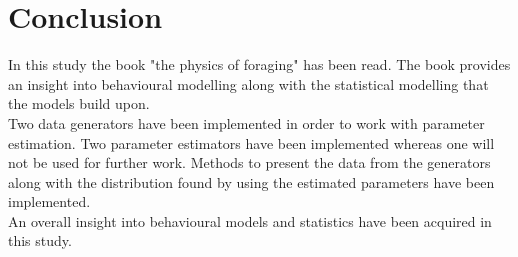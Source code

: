 \chapter{Conclusion}
In this study the book "the physics of foraging"\cite{viswanathan2011the} has been read. The book provides an insight into behavioural modelling along with the statistical modelling that the models build upon.\\
Two data generators have been implemented in order to work with parameter estimation. Two parameter estimators have been implemented whereas one will not be used for further work. Methods to present the data from the generators along with the distribution found by using the estimated parameters have been implemented.\\
An overall insight into behavioural models and statistics have been acquired in this study.\\